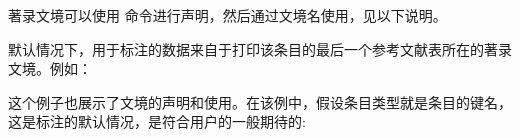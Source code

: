 
著录文境可以使用  命令进行声明，然后通过文境名使用，见以下说明。

默认情况下，用于标注的数据来自于打印该条目的最后一个参考文献表所在的著录文境。例如：

\begin{ltxexample}[style=latex]{}


\cite{book, article, misc}

\printbibliography[type=book]

\printbibliography[type=article]

\newrefcontext[sorting=ydnt]
\printbibliography[type=misc]


\end{ltxexample}
%
这个例子也展示了文境的声明和使用。在该例中，假设条目类型就是条目的键名，
这是标注的默认情况，是符合用户的一般期待的:


